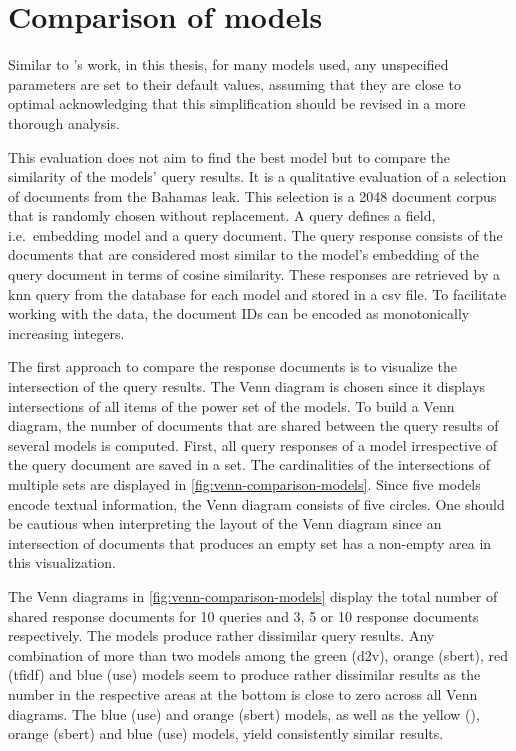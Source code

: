 \section{Comparison of models}\label{sec:evaluation-models}

Similar to \citeauthor{glove2014}'s work, in this thesis, for many models used, any unspecified parameters are set to their default values, 
assuming that they are close to optimal
acknowledging that this simplification should be revised in a more thorough analysis.

This evaluation does not aim to find the best model but to compare the similarity of the models' query results.
It is a qualitative evaluation of a selection of documents from the Bahamas leak.
This selection is a 2048 document corpus that is randomly chosen without replacement.
A query defines a field, i.e.\ embedding model and a query document.
The query response consists of the documents that are considered most similar to the model's embedding of the query document in terms of cosine similarity.
These responses are retrieved by a \ac{knn} query from the database for each model and stored in a \ac{csv} file.
To facilitate working with the data, the document IDs can be encoded as monotonically increasing integers.

The first approach to compare the response documents is to visualize the intersection of the query results.
The Venn diagram is chosen since it displays intersections of all items of the power set of the models.
To build a Venn diagram, the number of documents that are shared between the query results of several models is computed.
First, all query responses of a model irrespective of the query document are saved in a set.
The cardinalities of the intersections of multiple sets are displayed in \autoref{fig:venn-comparison-models}.
Since five models encode textual information, the Venn diagram consists of five circles.
One should be cautious when interpreting the layout of the Venn diagram since 
an intersection of documents that produces an empty set has a non-empty area in this visualization.

The Venn diagrams in \autoref{fig:venn-comparison-models} display the total number of shared response documents for 10 queries 
and 3, 5 or 10 response documents respectively.
The models produce rather dissimilar query results.
Any combination of more than two models among the green (\ac{d2v}), orange (\ac{sbert}), red (\ac{tfidf}) and blue (\ac{use}) models 
seem to produce rather dissimilar results 
as the number in the respective areas at the bottom is close to zero across all Venn diagrams.
The blue (\ac{use}) and orange (\ac{sbert}) models, as well as the yellow (\infersent{}), orange (\ac{sbert}) and blue (\ac{use}) models, 
yield consistently similar results.

